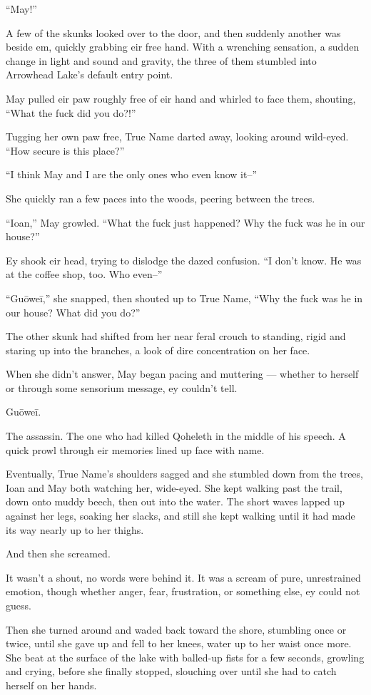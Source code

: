 ``May!''

A few of the skunks looked over to the door, and then suddenly another was beside em, quickly grabbing eir free hand. With a wrenching sensation, a sudden change in light and sound and gravity, the three of them stumbled into Arrowhead Lake's default entry point.

May pulled eir paw roughly free of eir hand and whirled to face them, shouting, ``What the fuck did you do?!''

Tugging her own paw free, True Name darted away, looking around wild-eyed. ``How secure is this place?''

``I think May and I are the only ones who even know it--''

She quickly ran a few paces into the woods, peering between the trees.

``Ioan,'' May growled. ``What the fuck just happened? Why the fuck was he in our house?''

Ey shook eir head, trying to dislodge the dazed confusion. ``I don't know. He was at the coffee shop, too. Who even--''

``Guōweī,'' she snapped, then shouted up to True Name, ``Why the fuck was he in our house? What did you do?''

The other skunk had shifted from her near feral crouch to standing, rigid and staring up into the branches, a look of dire concentration on her face.

When she didn't answer, May began pacing and muttering — whether to herself or through some sensorium message, ey couldn't tell.

Guōweī.

The assassin. The one who had killed Qoheleth in the middle of his speech. A quick prowl through eir memories lined up face with name.

Eventually, True Name's shoulders sagged and she stumbled down from the trees, Ioan and May both watching her, wide-eyed. She kept walking past the trail, down onto muddy beech, then out into the water. The short waves lapped up against her legs, soaking her slacks, and still she kept walking until it had made its way nearly up to her thighs.

And then she screamed.

It wasn't a shout, no words were behind it. It was a scream of pure, unrestrained emotion, though whether anger, fear, frustration, or something else, ey could not guess.

Then she turned around and waded back toward the shore, stumbling once or twice, until she gave up and fell to her knees, water up to her waist once more. She beat at the surface of the lake with balled-up fists for a few seconds, growling and crying, before she finally stopped, slouching over until she had to catch herself on her hands.

